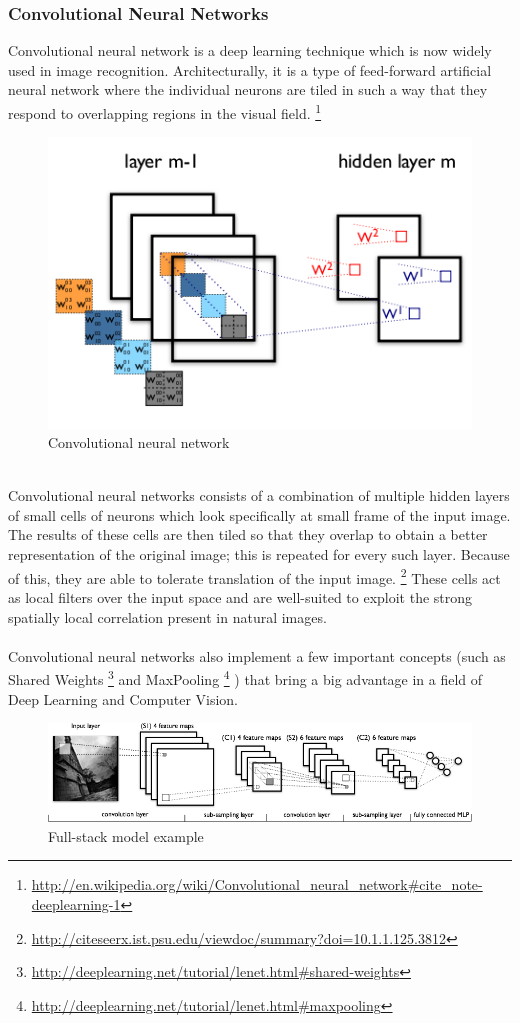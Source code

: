 \documentclass[a4paper,oneside,dvipsnames]{article}
\begin{document}
\subsubsection[Convolutional Neural Networks]{Convolutional Neural Networks}
Convolutional neural network is a deep learning technique which is now widely used in image recognition. Architecturally, it is a type of feed-forward artificial neural network where the individual neurons are tiled in such a way that they respond to overlapping regions in the visual field. \footnote{\url{http://en.wikipedia.org/wiki/Convolutional\_neural\_network\#cite\_note-deeplearning-1}}
\begin{figure}[h]
    \centering
    \includegraphics[scale=0.9]{cnn_explained.png}
    \caption{Convolutional neural network}
    \label{fig:cnn_explained}
\end{figure}
\\
Convolutional neural networks consists of a combination of multiple hidden layers of small cells of neurons which look specifically at small frame of the input image. The results of these cells are then tiled so that they overlap to obtain a better representation of the original image; this is repeated for every such layer. Because of this, they are able to tolerate translation of the input image. \footnote{\url{http://citeseerx.ist.psu.edu/viewdoc/summary?doi=10.1.1.125.3812}} These cells act as local filters over the input space and are well-suited to exploit the strong spatially local correlation present in natural images.\\\\
Convolutional neural networks also implement a few important concepts (such as Shared Weights
\footnote{\url{http://deeplearning.net/tutorial/lenet.html\#shared-weights}}
and MaxPooling
\footnote{\url{http://deeplearning.net/tutorial/lenet.html\#maxpooling}}
) that bring a big advantage in a field of Deep Learning and Computer Vision.
\begin{figure}[H] 
    \centering
    \includegraphics[scale=0.8]{mylenet.png}
    \caption{Full-stack model example}
    \label{fig:mylenet}
\end{figure}
\end{document}

